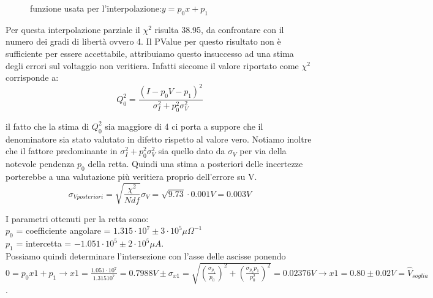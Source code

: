 \documentclass[a4paper]{article}
\theoremstyle{definition}
\begin{document}
\begin{figure}[!ht]
    \captionsetup{labelformat=empty}

	\caption{funzione usata per l'interpolazione:\(y = p_{0}x + p_{1}\)}

    \label{fig:retta_intensita_su_voltaggio}

\end{figure}
\noindent Per questa interpolazione parziale il \(\chi ^{2}\) risulta 38.95, da confrontare con il numero dei gradi di libertà ovvero 4. Il PValue per questo risultato non è sufficiente per essere accettabile, attribuiamo questo insuccesso ad una stima degli errori sul voltaggio non veritiera. Infatti siccome il valore riportato come \(\chi^{2}\) corrisponde a:
\[Q^{2}_{0} = \frac{(I - p_{0}V - p_{1})^{2}}{\sigma_{I}^{2} + p_{0}^{2}\sigma_{V}^{2} }\]

il fatto che la stima di \(Q^{2}_{0}\) sia maggiore di 4 ci porta a suppore che il denominatore sia stato valutato in difetto rispetto al valore vero. Notiamo inoltre che il fattore predominante in \(\sigma_{I}^{2} + p_{0}^{2}\sigma_{V}^{2}\) sia quello dato da \(\sigma_{V}\) per via della notevole pendenza \(p_{0}\) della retta. Quindi una stima a posteriori delle incertezze porterebbe a una valutazione più veritiera proprio dell'errore su V.\\
\[\sigma_{V posteriori} = \sqrt{\frac{\chi^{2}}{Ndf}} \sigma_{V} = \sqrt{9.73}\cdot 0.001V = 0.003V\]

\noindent I parametri ottenuti per la retta sono: \\
\(p_{0}\) = coefficiente angolare = \( 1.315 \cdot 10^{7} \pm  3 \cdot 10^{5} \mu \Omega^{-1}\) \\
\(p_{1}\) = intercetta = \( -1.051 \cdot 10^{5}  \pm  2 \cdot 10^{5} \mu A\).\\
Possiamo quindi determinare l'intersezione con l'asse delle ascisse ponendo\\ \(0=p_{0}x1 + p_{1} \rightarrow x1 = \frac{1.051 \cdot  10^{7}}{ 1.315 10^{7}} = 0.7988V \pm   \sigma_{x1}=\sqrt{ \left(\frac{\sigma_{p_{1}}}{p_{0}}\right)^{2} + \left(\frac{\sigma_{p_{0}}p_{1}}{p^{2}_{0}}\right)^{2}}=0.02376V \rightarrow x1 = 0.80 \pm 0.02 V = \hat{V}_{soglia}\).
\end{document}
